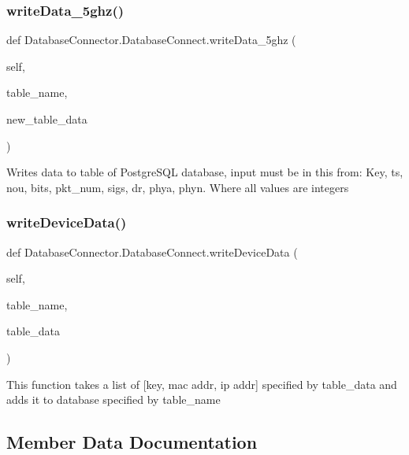 \subsubsection{\texorpdfstring{write\+Data\+\_\+5ghz()}{writeData\_5ghz()}}
{\footnotesize\ttfamily def Database\+Connector.\+Database\+Connect.\+write\+Data\+\_\+5ghz (\begin{DoxyParamCaption}\item[{}]{self,  }\item[{}]{table\+\_\+name,  }\item[{}]{new\+\_\+table\+\_\+data }\end{DoxyParamCaption})}

\begin{DoxyVerb}Writes data to table of PostgreSQL database, input must be in this from: Key, ts, nou, bits, pkt_num, sigs, dr, phya, phyn. Where all values are integers\end{DoxyVerb}
 \mbox{\label{classDatabaseConnector_1_1DatabaseConnect_af67bc1a7983d83e2df140bc3cec92d84}} 
\subsubsection{\texorpdfstring{write\+Device\+Data()}{writeDeviceData()}}
{\footnotesize\ttfamily def Database\+Connector.\+Database\+Connect.\+write\+Device\+Data (\begin{DoxyParamCaption}\item[{}]{self,  }\item[{}]{table\+\_\+name,  }\item[{}]{table\+\_\+data }\end{DoxyParamCaption})}

\begin{DoxyVerb}This function takes a list of [key, mac addr, ip addr] specified by table_data and adds it to database specified by table_name\end{DoxyVerb}
 

\subsection{Member Data Documentation}
\mbox{\label{classDatabaseConnector_1_1DatabaseConnect_a032674c05648a8ba31c2ef9a1363338e}} 
